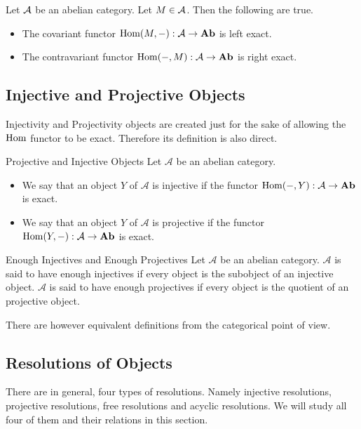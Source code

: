 \documentclass[a4paper]{article}
\begin{document}
\begin{thm}{}{} Let $\mathcal{A}$ be an abelian category. Let $M\in\mathcal{A}$. Then the following are true. 
\begin{itemize}
\item The covariant functor $\operatorname{Hom}(M,-):\mathcal{A}\to\bold{Ab}$ is left exact. 
\item The contravariant functor $\operatorname{Hom}(-,M):\mathcal{A}\to\bold{Ab}$ is right exact. 
\end{itemize}
\end{thm}

\subsection{Injective and Projective Objects}
Injectivity and Projectivity objects are created just for the sake of allowing the $\operatorname{Hom}$ functor to be exact. Therefore its definition is also direct. 

\begin{defn}{Projective and Injective Objects}{} Let $\mathcal{A}$ be an abelian category. 
\begin{itemize}
\item We say that an object $Y$ of $\mathcal{A}$ is injective if the functor $\operatorname{Hom}(-,Y):\mathcal{A}\to\bold{Ab}$ is exact. 
\item We say that an object $Y$ of $\mathcal{A}$ is projective if the functor $\operatorname{Hom}(Y,-):\mathcal{A}\to\bold{Ab}$ is exact. 
\end{itemize}
\end{defn}

\begin{defn}{Enough Injectives and Enough Projectives}{} Let $\mathcal{A}$ be an abelian category. $\mathcal{A}$ is said to have enough injectives if every object is the subobject of an injective object. $\mathcal{A}$ is said to have enough projectives if every object is the quotient of an projective object. 
\end{defn}

There are however equivalent definitions from the categorical point of view. 

\subsection{Resolutions of Objects}
There are in general, four types of resolutions. Namely injective resolutions, projective resolutions, free resolutions and acyclic resolutions. We will study all four of them and their relations in this section. 
\end{document}
